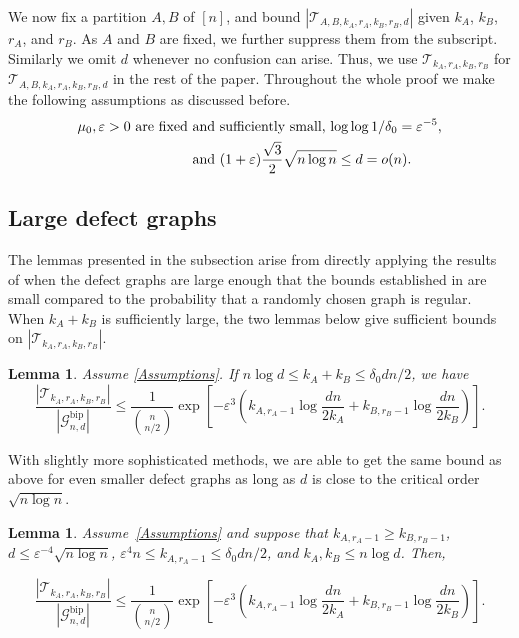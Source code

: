 \documentclass[11pt]{article}
\newcommand{\eps}{\varepsilon}
\theoremstyle{plain}
\newtheorem{lem}[thm]{Lemma}
\begin{document}
We now fix a partition $A,B$ of $[n]$, and bound $|\mathcal T_{A, B, k_A, r_A, k_B, r_B, d}|$ given $k_A$, $k_B$, $r_A$, and $r_B$. As $A$ and $B$ are fixed, we further suppress them from the subscript. Similarly we omit $d$ whenever no confusion can arise. Thus, we use $\mathcal T_{k_A, r_A, k_B, r_B}$ for $\mathcal T_{A, B, k_A, r_A, k_B, r_B, d}$ in the rest of the paper. Throughout the whole proof we make the following assumptions as discussed before.
\begin{align}
\text{$\mu_0, \varepsilon > 0$ are fixed }&\text{and sufficiently small,    $\log\log 1/\delta_0 = \varepsilon^{-5}$,}\notag\\ 
&\text{and $(1 + \varepsilon)\frac{\sqrt 3}{2}\sqrt{n\log n} \leq d = o(n)$.}\label{Assumptions}
\end{align}




\subsection{Large defect graphs}
The lemmas presented in the subsection arise from directly applying the results of \cite{osthus2003densities} when the defect graphs are large enough that the bounds established in \cite{osthus2003densities} are small compared to the probability that a randomly chosen graph is regular.
When $k_A + k_B$ is sufficiently large, the two lemmas below give sufficient bounds on 
$|\mathcal T_{k_A, r_A, k_B, r_B}|$.


\begin{lem}\label{lem: large k far threshold}
    Assume \eqref{Assumptions}. If $n\log d \leq k_A + k_B \leq \delta_0dn/2$, we have
    \[
    \frac{|\mathcal T_{k_A, r_A, k_B, r_B}|}{|\mathcal G_{n,d}^{\text{bip}}|} \leq \frac{1}{\binom{n}{n/2}}\exp\left[-\varepsilon^{3}\left(k_{A, r_A - 1}\log \frac{dn}{2k_A} + k_{B, r_B - 1}\log\frac{dn}{2k_B}\right)\right].
    \]
    
    \end{lem}


With slightly more sophisticated methods, we are able to get the same bound as above for even smaller defect graphs as long as $d$ is close to the critical order $\sqrt{n \log n}$.

    \begin{lem}\label{lem: large k near threshold}
Assume~\eqref{Assumptions} and suppose that $k_{A,r_A-1}\ge k_{B,r_B-1}$, $d \leq \eps^{-4}\sqrt{n\log n}$, $\eps^4 n \leq k_{A,r_A-1} \leq \delta_0dn/2$, and $k_A, k_B \leq n\log d$. Then,
  
    \[
    \frac{|\mathcal T_{k_A, r_A, k_B, r_B}|}{|\mathcal G_{n,d}^{\text{bip}}|} \leq \frac{1}{\binom{n}{n/2}}\exp\left[-{\varepsilon^{3}}\left(k_{A, r_A - 1}\log \frac{dn}{2k_A} + k_{B, r_B - 1}\log\frac{dn}{2k_B}\right)\right].
    \]
    
\end{lem}
\end{document}

